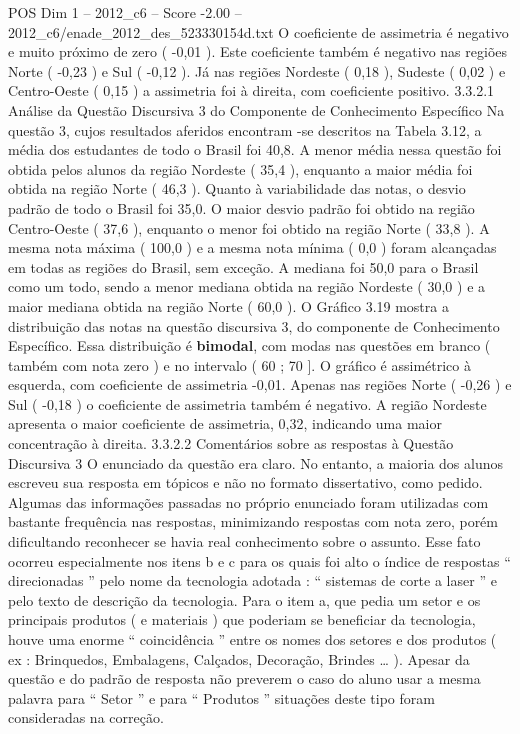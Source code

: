 \begin{textsample}{POS Dim 1 – 2012\_c6 – Score -2.00 – 2012\_c6/enade\_2012\_des\_523330154d.txt}
O coeficiente de assimetria é negativo e muito próximo de zero ( -0,01 ).
Este coeficiente também é negativo nas regiões Norte ( -0,23 ) e Sul ( -0,12 ).
Já nas regiões Nordeste ( 0,18 ), Sudeste ( 0,02 ) e Centro-Oeste ( 0,15 ) a assimetria foi à direita, com coeficiente positivo. 3.3.2.1 Análise da Questão Discursiva 3 do Componente de Conhecimento Específico Na questão 3, cujos resultados aferidos encontram -se descritos na Tabela 3.12, a média dos estudantes de todo o Brasil foi 40,8.
A menor média nessa questão foi obtida pelos alunos da região Nordeste ( 35,4 ), enquanto a maior média foi obtida na região Norte ( 46,3 ).
Quanto à variabilidade das notas, o desvio padrão de todo o Brasil foi 35,0.
O maior desvio padrão foi obtido na região Centro-Oeste ( 37,6 ), enquanto o menor foi obtido na região Norte ( 33,8 ).
A mesma nota máxima ( 100,0 ) e a mesma nota mínima ( 0,0 ) foram alcançadas em todas as regiões do Brasil, sem exceção.
A mediana foi 50,0 para o Brasil como um todo, sendo a menor mediana obtida na região Nordeste ( 30,0 ) e a maior mediana obtida na região Norte ( 60,0 ).
O Gráfico 3.19 mostra a distribuição das notas na questão discursiva 3, do componente de Conhecimento Específico.
Essa distribuição é \textbf{bimodal}, com modas nas questões em branco ( também com nota zero ) e no intervalo ( 60 ; 70 ].
O gráfico é assimétrico à esquerda, com coeficiente de assimetria -0,01.
Apenas nas regiões Norte ( -0,26 ) e Sul ( -0,18 ) o coeficiente de assimetria também é negativo.
A região Nordeste apresenta o maior coeficiente de assimetria, 0,32, indicando uma maior concentração à direita. 3.3.2.2 Comentários sobre as respostas à Questão Discursiva 3 O enunciado da questão era claro.
No entanto, a maioria dos alunos escreveu sua resposta em tópicos e não no formato dissertativo, como pedido.
Algumas das informações passadas no próprio enunciado foram utilizadas com bastante frequência nas respostas, minimizando respostas com nota zero, porém dificultando reconhecer se havia real conhecimento sobre o assunto.
Esse fato ocorreu especialmente nos itens b e c para os quais foi alto o índice de respostas “ direcionadas ” pelo nome da tecnologia adotada : “ sistemas de corte a laser ” e pelo texto de descrição da tecnologia.
Para o item a, que pedia um setor e os principais produtos ( e materiais ) que poderiam se beneficiar da tecnologia, houve uma enorme “ coincidência ” entre os nomes dos setores e dos produtos ( ex : Brinquedos, Embalagens, Calçados, Decoração, Brindes … ).
Apesar da questão e do padrão de resposta não preverem o caso do aluno usar a mesma palavra para “ Setor ” e para “ Produtos ” situações deste tipo foram consideradas na correção.

\end{textsample}

